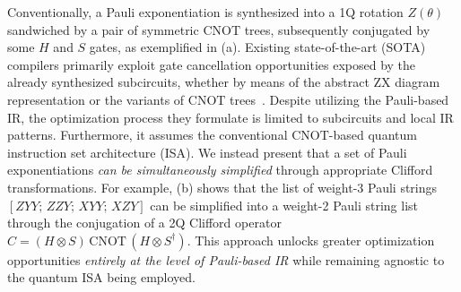 \documentclass[conference,9pt]{IEEEtran}
\newcommand{\CNOT}{\mathrm{CNOT}}
\begin{document}
    Conventionally, a Pauli exponentiation is synthesized into a 1Q rotation $ Z(\theta) $ sandwiched by a pair of symmetric $ \CNOT $ trees, subsequently conjugated by some $ H $ and $ S $ gates, as exemplified in  (a). Existing state-of-the-art (SOTA) compilers primarily exploit gate cancellation opportunities exposed by the already synthesized subcircuits, whether by means of the abstract ZX diagram~\cite{cowtan2019phase,van2023towards,paykin2023pcoast} representation or the variants of $ \CNOT $ trees~\cite{li2022paulihedral,jin2024tetris}. Despite utilizing the Pauli-based IR, the optimization process they formulate is limited to subcircuits and local IR patterns. Furthermore, it assumes the conventional $ \CNOT $-based quantum instruction set architecture (ISA). We instead present that a set of Pauli exponentiations \emph{can be simultaneously simplified} through appropriate Clifford transformations. For example,  (b) shows that the list of weight-3 Pauli strings $ [ZYY;\, ZZY;\, XYY;\, XZY] $ can be simplified into a weight-2 Pauli string list through the conjugation of a 2Q Clifford operator $ C = (H\otimes S)\, \CNOT\, (H\otimes S^\dagger) $. This approach unlocks greater optimization opportunities \emph{entirely at the level of Pauli-based IR} while remaining agnostic to the quantum ISA being employed.
\end{document}
